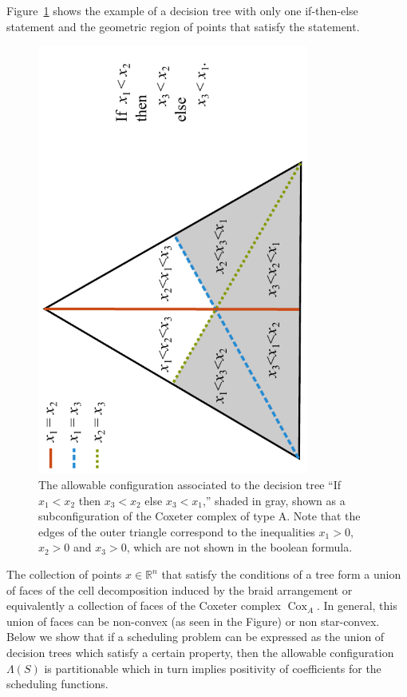 \documentclass[12pt,reqno]{amsart}
\numberwithin{definition}{section}
\theoremstyle{definition}
\newcommand{\cox}{\operatorname{Cox}}
\newcommand{\allow}{\Lambda} %
\begin{document}
Figure~\ref{fig:tree} shows the example of a decision tree with only one if-then-else statement and the geometric region of points that satisfy the statement.   
\begin{figure}[h]
\includegraphics[angle=270,width=3.5in]{simple_decision_tree}
\caption{The allowable configuration associated to the decision tree ``If $x_1<x_2$ then $x_3<x_2$ else $x_3<x_1$,'' shaded in gray, shown as a subconfiguration of the Coxeter complex of type A. Note that the edges of the outer triangle correspond to the inequalities $x_1>0$, $x_2>0$ and $x_3>0$, which are not shown in the boolean formula.}
\label{fig:tree}
\end{figure}
The collection of points $x \in \mathbb{R}^n$ that satisfy the conditions of a tree form a union of faces of the cell decomposition induced by the braid arrangement or equivalently a collection of faces of the Coxeter complex $\cox_A$.  In general, this union of faces can be non-convex (as seen in the Figure) or non star-convex.  Below we show that if a scheduling problem can be expressed as the union of decision trees which satisfy a certain property, then the allowable configuration $\allow(S)$ is partitionable which in turn implies positivity of coefficients for the scheduling functions. 
\end{document}
